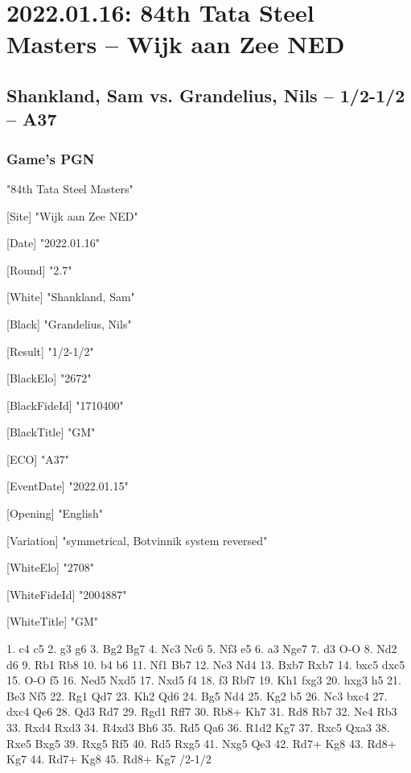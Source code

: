 \documentclass[9pt]{extarticle}
\begin{document}
\section*{2022.01.16: 84th Tata Steel Masters -- Wijk aan Zee NED}

\subsection*{Shankland, Sam vs. Grandelius, Nils -- 1/2-1/2 -- A37}
\subsubsection*{Game's PGN}
\begin{flushleft}
[Event] "84th Tata Steel Masters"

[Site] "Wijk aan Zee NED"

[Date] "2022.01.16"

[Round] "2.7"

[White] "Shankland, Sam"

[Black] "Grandelius, Nils"

[Result] "1/2-1/2"

[BlackElo] "2672"

[BlackFideId] "1710400"

[BlackTitle] "GM"

[ECO] "A37"

[EventDate] "2022.01.15"

[Opening] "English"

[Variation] "symmetrical, Botvinnik system reversed"

[WhiteElo] "2708"

[WhiteFideId] "2004887"

[WhiteTitle] "GM"

\end{flushleft}
\begin{flushleft}
1. c4 c5 2. g3 g6 3. Bg2 Bg7 4. Nc3 Nc6 5. Nf3 e5 6. a3 Nge7 7. d3 O-O 8. Nd2 d6 9. Rb1 Rb8 10. b4 b6 11. Nf1 Bb7 12. Ne3 Nd4 13. Bxb7 Rxb7 14. bxc5 dxc5 15. O-O f5 16. Ned5 Nxd5 17. Nxd5 f4 18. f3 Rbf7 19. Kh1 fxg3 20. hxg3 h5 21. Be3 Nf5 22. Rg1 Qd7 23. Kh2 Qd6 24. Bg5 Nd4 25. Kg2 b5 26. Nc3 bxc4 27. dxc4 Qe6 28. Qd3 Rd7 29. Rgd1 Rff7 30. Rb8+ Kh7 31. Rd8 Rb7 32. Ne4 Rb3 33. Rxd4 Rxd3 34. R4xd3 Bh6 35. Rd5 Qa6 36. R1d2 Kg7 37. Rxc5 Qxa3 38. Rxe5 Bxg5 39. Rxg5 Rf5 40. Rd5 Rxg5 41. Nxg5 Qe3 42. Rd7+ Kg8 43. Rd8+ Kg7 44. Rd7+ Kg8 45. Rd8+ Kg7 \quad  {}/2-1/2
\end{flushleft}
\parindent 0mm
\end{document}
